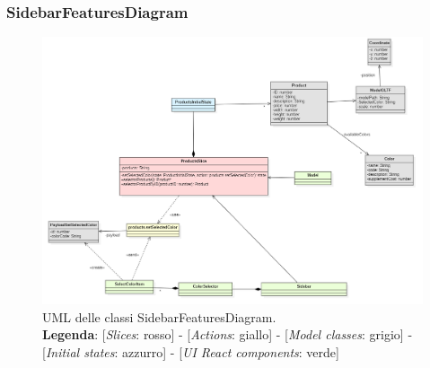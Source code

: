 \begin{landscape}
	\thispagestyle{empty}
	\subsubsection{SidebarFeaturesDiagram}
	\begin{figure}[H]
		\centering
		\includegraphics[scale=0.7, keepaspectratio]{./res/images/sidebarFeaturesDiagram.PNG}
		\caption[UML delle classi SidebarFeaturesDiagram]{
			UML delle classi SidebarFeaturesDiagram.
			\\
			\textbf{Legenda}: 
			[\textit{Slices}: rosso] -
			[\textit{Actions}: giallo] -
			[\textit{Model classes}: grigio] -
			[\textit{Initial states}: azzurro] -
			[\textit{UI React components}: verde]}
		\end{figure}
	\end{landscape}
	\restoregeometry
